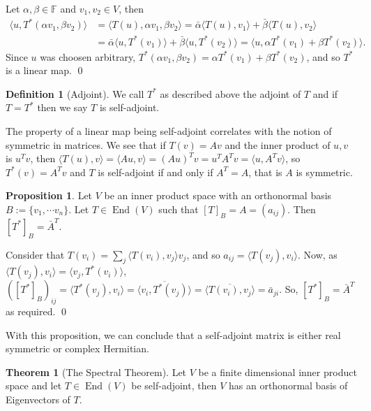 \documentclass[
]{article}
\theoremstyle{definition}
\newtheorem{theorem}{Theorem}
\newtheorem{prop}{Proposition}[section]
\theoremstyle{definition}
\newtheorem{definition}{Definition}[section]
\begin{document}
Let \(\alpha, \beta \in \mathbb{F}\) and \(v_1, v_2 \in V\), then
\begin{align*}
    \langle u, T^*(\alpha v_1, \beta v_2) \rangle 
    & = \langle T(u), \alpha v_1, \beta v_2 \rangle 
    = \bar{\alpha} \langle T(u), v_1 \rangle + \bar{\beta} \langle T(u), v_2 \rangle \\ 
    & = \bar{\alpha} \langle u, T^*(v_1) \rangle + \bar{\beta} \langle u, T^*(v_2) \rangle = 
    \langle u, \alpha T^*(v_1) + \beta T^*(v_2) \rangle.
  \end{align*} Since \(u\) was choosen arbitrary,
\(T^*(\alpha v_1, \beta v_2) =  \alpha T^*(v_1) + \beta T^*(v_2)\), and
so \(T^*\) is a linear map. \qed

\begin{definition}[Adjoint]
  We call \(T^*\) as described above the adjoint of \(T\) and if \(T = T^*\) then 
  we say \(T\) is self-adjoint.
\end{definition}

The property of a linear map being self-adjoint correlates with the
notion of symmetric in matrices. We see that if \(T(v) = Av\) and the
inner product of \(u, v\) is \(u^T v\), then
\(\langle T(u), v \rangle = \langle Au, v \rangle = (Au)^T v = u^T A^Tv = \langle u, A^T v \rangle\),
so \(T^*(v) = A^T v\) and \(T\) is self-adjoint if and only if
\(A^T = A\), that is \(A\) is symmetric.

\begin{prop}
  Let \(V\) be an inner product space with an orthonormal basis 
  \(B := \{v_1, \cdots v_n\}\). Let \(T \in \mathop{\mathrm{End}}(V)\) such that 
  \([T]_B = A = (a_{ij})\). Then \([T^*]_B = \bar{A}^T\).
\end{prop}
\proof

Consider that \(T(v_i) = \sum_j \langle T(v_i), v_j \rangle v_j\), and
so \(a_{ij} = \langle T(v_j), v_i \rangle\). Now, as
\(\langle T(v_j), v_i \rangle = \langle v_j, T^*(v_i) \rangle\),
\(([T^*]_B)_{ij} = \langle T^*(v_j), v_i \rangle =  \overline{\langle v_i, T^*(v_j) \rangle} =  \overline{\langle T(v_i), v_j \rangle} = \bar{a}_{ji}\).
So, \([T^*]_B = \bar{A}^T\) as required. \qed

With this proposition, we can conclude that a self-adjoint matrix is
either real symmetric or complex Hermitian.

\begin{theorem}[The Spectral Theorem]
  Let \(V\) be a finite dimensional inner product space and let \(T \in \mathop{\mathrm{End}}(V)\) 
  be self-adjoint, then \(V\) has an orthonormal basis of Eigenvectors of \(T\).
\end{theorem}
\end{document}
